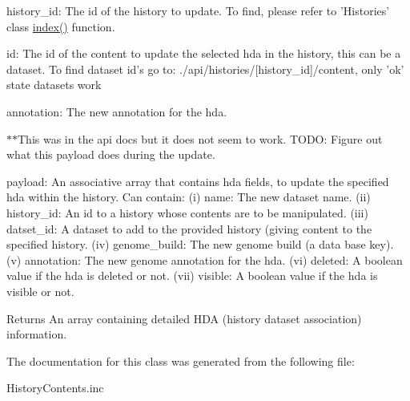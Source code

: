 \begin{DoxyItemize}
\item history\-\_\-id\-: The id of the history to update. To find, please refer to 'Histories' class \hyperlink{classGalaxyHistoryContents_a3af87a8eba32cda496d73d4ec87808fb}{index()} function.
\item id\-: The id of the content to update the selected hda in the history, this can be a dataset. To find dataset id's go to\-: ./api/histories/\mbox{[}history\-\_\-id\mbox{]}/content, only 'ok' state datasets work
\item annotation\-: The new annotation for the hda.

$\ast$$\ast$\-This was in the api docs but it does not seem to work. T\-O\-D\-O\-: Figure out what this payload does during the update.
\item payload\-: An associative array that contains hda fields, to update the specified hda within the history. Can contain\-: (i) name\-: The new dataset name. (ii) history\-\_\-id\-: An id to a history whose contents are to be manipulated. (iii) datset\-\_\-id\-: A dataset to add to the provided history (giving content to the specified history. (iv) genome\-\_\-build\-: The new genome build (a data base key). (v) annotation\-: The new genome annotation for the hda. (vi) deleted\-: A boolean value if the hda is deleted or not. (vii) visible\-: A boolean value if the hda is visible or not. \begin{DoxyReturn}{Returns}
An array containing detailed H\-D\-A (history dataset association) information. 
\end{DoxyReturn}

\end{DoxyItemize}

The documentation for this class was generated from the following file\-:\begin{DoxyCompactItemize}
\item 
History\-Contents.\-inc\end{DoxyCompactItemize}
